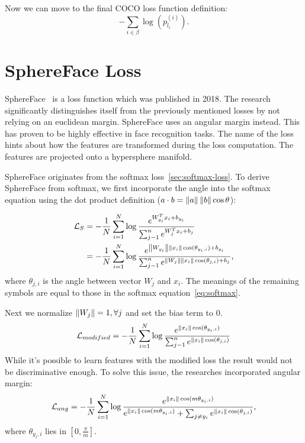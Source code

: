 Now we can move to the final COCO loss function definition:
\begin{equation}
    - \sum_{i \in \beta} \log \left( p_{l_i}^{(i)} \right).
\end{equation}

\section{SphereFace Loss}\label{sec:sphereface-loss}
SphereFace~\cite{SphereFace} is a loss function which was published in 2018.
The research significantly distinguishes itself from the previously mentioned losses by not relying on an euclidean
margin.
SphereFace uses an angular margin instead.
This has proven to be highly effective in face recognition tasks.
The name of the loss hints about how the features are transformed during the loss computation.
The features are projected onto a hypersphere manifold.

SphereFace originates from the softmax loss~\ref{sec:softmax-loss}.
To derive SphereFace from softmax, we first incorporate the angle into the softmax equation using the dot
product definition ($a \cdot b = \left\lVert a\right\rVert \left\lVert b\right\rVert \cos \theta$):

\begin{align*}
    \mathcal{L}_S &= -\frac{1}{N} \sum_{i=1}^{N} \log \frac{e^{W^T_{y_i} x_{i} + b_{y_i}}}
    {\sum_{j-1}^{n} e^{W^T_{j} x_{i} + b_{j}}} \\
    &= -\frac{1}{N} \sum_{i=1}^{N} \log \frac{e^{\left\lVert W_{y_i}\right\rVert \left\lVert x_i\right\rVert \cos(\theta_{y_i,i}) + b_{y_i}}}
    {\sum_{j-1}^{n} e^{\left\lVert W_j\right\rVert \left\lVert x_{i}\right\rVert \cos(\theta_{j,i}) + b_{j}}},
\end{align*}
where $\theta_{j,i}$ is the angle between vector $W_j$ and $x_i$.
The meanings of the remaining symbols are equal to those in the softmax equation~\ref{eq:softmax}.

Next we normalize $\left\lVert W_j\right\rVert = 1, \forall j$ and set the bias term to 0.
\begin{equation}
    \label{eq:softmaxmod}
    \mathcal{L}_{modified} = -\frac{1}{N} \sum_{i=1}^{N} \log \frac{e^{\left\lVert x_i\right\rVert \cos(\theta_{y_i,i})}}
    {\sum_{j-1}^{n} e^{\left\lVert x_{i}\right\rVert \cos(\theta_{j,i})}}
\end{equation}
While it's possible to learn features with the modified loss the result would not be discriminative enough.
To solve this issue, the researches incorporated angular margin:
\begin{equation}
    \label{eq:ang}
    \mathcal{L}_{ang} = -\frac{1}{N} \sum_{i=1}^{N} \log \frac{e^{\left\lVert x_i\right\rVert \cos(m\theta_{y_i,i})}}
    {e^{\left\lVert x_i\right\rVert \cos(m\theta_{y_i,i})} + \sum_{j \neq y_i} e^{\left\lVert x_{i}\right\rVert \cos(\theta_{j,i})}},
\end{equation}
where $\theta_{y_i,i}$ lies in $\left[ 0, \frac{\pi}{m} \right]$.


